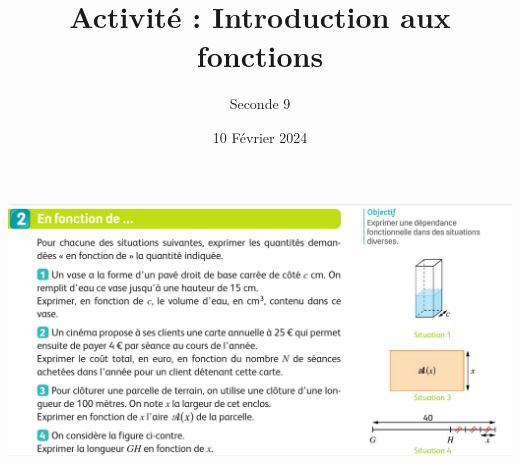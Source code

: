 \documentclass{article}
\title{Activité : Introduction aux fonctions}
\author{Seconde 9}
\date{10 Février 2024}
\begin{document}
\maketitle

\begin{center}
\includegraphics[width=\textwidth]{Activite.png}
\end{center}
\end{document}
